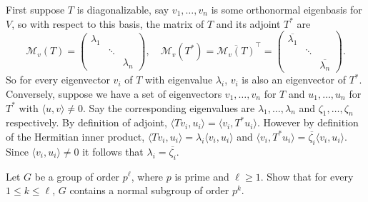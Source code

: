 \documentclass[11pt, letterpaper]{article}
\begin{document}
First suppose $T$ is diagonalizable, say $v_1,\ldots,v_n$ is some orthonormal eigenbasis for $V$, so with respect to this basis, the matrix of $T$ and its adjoint $T^*$ are 
\[
    \mathcal{M}_{v}(T) = \begin{pmatrix}\lambda_1&&\\ &\ddots&\\ &&\lambda_n\end{pmatrix},\quad
        \mathcal{M}_{v}(T^*)=\overline{\mathcal{M}_{v}(T)}^\intercal= \begin{pmatrix}\overline{\lambda_1}&&\\ &\ddots&\\ &&\overline{\lambda_n}\end{pmatrix}
.\] 
So for every eigenvector $v_i$ of $T$ with eigenvalue $\lambda_i$, $v_i$ is also an eigenvector of $T^*$. Conversely, suppose we have a set of eigenvectors $v_1,\ldots,v_n$ for $T$ and $u_1,\ldots,u_n$ for $T^*$ with $\langle u, v\rangle\neq 0$. Say the corresponding eigenvalues are $\lambda_1,\ldots,\lambda_n$ and $\zeta_1,\ldots,\zeta_n$ respectively. By definition of adjoint, $\langle Tv_i, u_i\rangle = \langle v_i, T^*u_i\rangle$. However by definition of the Hermitian inner product, $\langle Tv_i, u_i\rangle = \lambda_i\langle v_i, u_i\rangle$ and $\langle v_i, T^*u_i\rangle=\overline{\zeta_i}\langle v_i, u_i\rangle$. Since $\langle v_i, u_i\rangle\neq 0$ it follows that $\lambda_i=\overline{\zeta_i}$.
\pagebreak
\begin{problem}[6 points]
    Let $G$ be a group of order $p^\ell$, where $p$ is prime and $\ell\geq 1$.  Show that for every $1\leq k\le \ell$, $G$ contains a normal subgroup of order $p^k$.
\end{problem}
\end{document}
